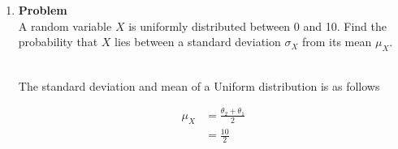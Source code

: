 \documentclass[12pt]{article}
\newenvironment{Ex}{\textbf{Problem}\vspace{.75em}\\}{}
\begin{document}
\begin{enumerate}
\begin{Ex}
\begin{solution}
      \begin{enumerate}
      \item We must find $P(X \ge 5.2) + P(X \le 4.8)$.
        \begin{equation}
          \label{eq:4a-sol}
          \begin{aligned}
            P(X \ge 5.2) + P(X \le 4.8) &= (1-P(X \le 4.8)) + (1-P(X
            \le 4.8)) \\
            &= 2-2P(X \le 4.8) \\
            \implies P(X \ge 5.2) + P(X \le 4.8) &= 0.3174.
          \end{aligned}
        \end{equation}
      \item The probability that a bolt is not defective is the
        complement of our result in \cref{eq:4a-sol} ($0.6286$). The
        probability that all ten bolts will not be defective is
        \begin{equation}
          \label{eq:4b-sol}
          \begin{aligned}
            P(\text{none defective}) &= {10 \choose 10}
            (0.6826)^{10}(1-0.6826)^0 \\
            &= 0.6826^{10} \\
            \implies P(\text{none defective}) &= 0.02196 \\
          \end{aligned}
        \end{equation}
      \end{enumerate}
    \end{solution}
  \end{Ex}
\item
  \begin{Ex}
    A random variable $X$ is uniformly distributed between 0 and
    10. Find the probability that $X$ lies between a standard deviation
    $\sigma_X$ from its mean $\mu_X$.
    \begin{solution} \hfill \vspace{.75em}\\
      The standard deviation and mean of a Uniform distribution is as
      follows
      \begin{multicols}{2}
        \begin{equation}
          \label{eq:5-dev}
          \begin{aligned}
            \mu_X &= \frac{\theta_2 + \theta_1}{2} \\
            &= \frac{10}{2} \\

\end{aligned}
\end{equation}
\end{multicols}
\end{solution}
\end{Ex}
\end{enumerate}
\end{document}
